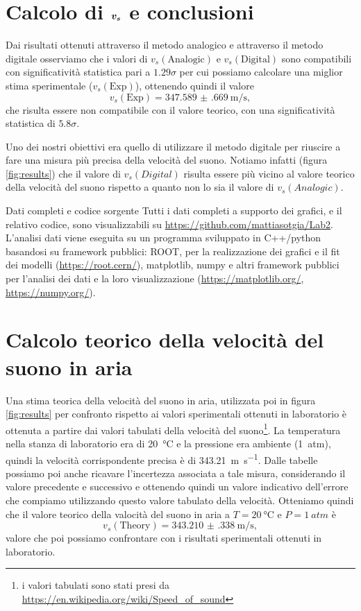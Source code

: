 \documentclass[
    rmp,
    reprint, 
    superscriptaddress, 
    altaffilletter, 
    amsmath, 
    amssymb, 
    a4paper,
    varvw]{revtex4-2}
\begin{document}
\iffalse
\fi

\section{Calcolo di $\vb*{v_s}$ e conclusioni}
Dai risultati ottenuti attraverso il metodo analogico e attraverso il metodo digitale osserviamo che i valori di $v_s(\text{Analogic})$ e $v_s(\text{Digital})$ sono compatibili con significatività statistica pari a $1.29\sigma$ per cui possiamo calcolare una miglior stima sperimentale ($v_s(\text{Exp})$), ottenendo quindi il valore \[v_s(\text{Exp}) = \SI{347.589(669)}{\metre\per\second},\] che risulta essere non compatibile con il valore teorico, con una significatività statistica di $5.8\sigma$. 

Uno dei nostri obiettivi era quello di utilizzare il metodo digitale per riuscire a fare una misura più precisa della velocità del suono. Notiamo infatti (figura \ref{fig:results}) che il valore di $v_s(Digital)$ risulta essere più vicino al valore teorico della velocità del suono rispetto a quanto non lo sia il valore di $v_s(Analogic)$. 


\begin{methods}{D\lowercase{ati completi e codice sorgente}}
    Tutti i dati completi a supporto dei grafici, e il relativo codice, sono visualizzabili su \url{https://github.com/mattiasotgia/Lab2}. L'analisi dati viene eseguita su un programma sviluppato in C++/python basandosi su framework pubblici: ROOT, per la realizzazione dei grafici e il fit dei modelli (\url{https://root.cern/}), matplotlib, numpy e altri framework pubblici per l'analisi dei dati e la loro visualizzazione (\url{https://matplotlib.org/}, \url{https://numpy.org/}).
\end{methods}

\appendix

\section{Calcolo teorico della velocità del suono in aria}
Una stima teorica della velocità del suono in aria, utilizzata poi in figura \ref{fig:results} per confronto rispetto ai valori sperimentali ottenuti in laboratorio è ottenuta a partire dai valori tabulati della velocità del suono\footnote{i valori tabulati sono stati presi da \url{https://en.wikipedia.org/wiki/Speed_of_sound}}. La temperatura nella stanza di laboratorio era di \SI{20}{\celsius} e la pressione era ambiente (\SI{1}{atm}), quindi la velocità corrispondente precisa è di \SI{343.21}{\metre\per\second}. Dalle tabelle possiamo poi anche ricavare l'incertezza associata a tale misura, considerando il valore precedente e successivo e ottenendo quindi un valore indicativo dell'errore che compiamo utilizzando questo valore tabulato della velocità. Otteniamo quindi che il valore teorico della valocità del suono in aria a $T=\SI{20}{\celsius}$ e $P=\SI{1}{atm}$ è \[v_s(\text{Theory}) = \SI{343.210(338)}{\metre\per\second},\] valore che poi possiamo confrontare con i risultati sperimentali ottenuti in laboratorio. 

\setcounter{table}{0}
\renewcommand{\thetable}{A-\Roman{table}}
\end{document}
